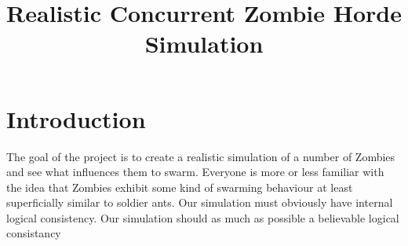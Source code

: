 \pagestyle{empty}

%

\title{Realistic Concurrent Zombie Horde Simulation}
\maketitle

\section{Introduction}
The goal of the project is to create a realistic simulation of a number of Zombies and see what influences them to swarm.
Everyone is more or less familiar with the idea that Zombies exhibit some kind of swarming behaviour at least superficially similar to soldier ants.
Our simulation must obviously have internal logical consistency.
Our simulation should as much as possible a believable logical consistancy
%
\endinput
